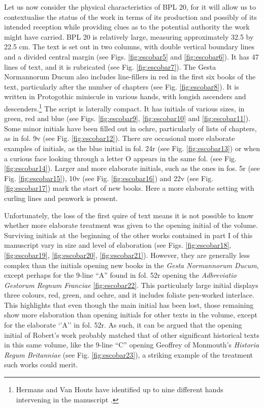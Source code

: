 \documentclass{article}
\begin{document}
Let us now consider the physical characteristics of BPL 20, for it will
allow us to contextualise the status of the work in terms of its
production and possibly of its intended reception while providing clues
as to the potential authority the work might have carried. BPL 20 is
relatively large, measuring approximately 32.5 by 22.5 cm. The text is
set out in two columns, with double vertical boundary lines and a
divided central margin (see Figs. \ref{fig:escobar5} and \ref{fig:escobar6}). It has 47 lines of text, and
it is rubricated (see Fig. \ref{fig:escobar7}). The Gesta Normannorum Ducum also includes
line-fillers in red in the first six books of the text, particularly
after the number of chapters (see Fig. \ref{fig:escobar8}). It is written in Protogothic
miniscule in various hands, with longish ascenders and
descenders.\footnote{Hermans and Van Houts have identified up to nine
  different hands intervening in the manuscript \citep[80]{hermans_history_1983}.} The script is laterally compact. It has initials of
various sizes, in green, red and blue (see Figs. \ref{fig:escobar9}, \ref{fig:escobar10} and \ref{fig:escobar11}). Some
minor initials have been filled out in ochre, particularly of lists of
chapters, as in fol. 9v (see Fig. \ref{fig:escobar12}). There are occasional more
elaborate examples of initials, as the blue initial in fol. 24r (see
Fig. \ref{fig:escobar13}) or when a curious face looking through a letter O appears in
the same fol. (see Fig. \ref{fig:escobar14}). Larger and more elaborate initials, such as
the ones in fos. 5r (see Fig. \ref{fig:escobar15}), 10v (see Fig. \ref{fig:escobar16}) and 22v (see Fig.
\ref{fig:escobar17}) mark the start of new books. Here a more elaborate setting with
curling lines and penwork is present.

Unfortunately, the loss of the first quire of text means it is not
possible to know whether more elaborate treatment was given to the
opening initial of the volume. Surviving initials at the beginning of
the other works contained in part I of this manuscript vary in size and
level of elaboration (see Figs. \ref{fig:escobar18}, \ref{fig:escobar19}, \ref{fig:escobar20}, \ref{fig:escobar21}). However, they are generally
less complex than the initials opening new books in the \emph{Gesta
Normannorum Ducum}, except perhaps for the 9-line ``A'' found in fol. 52r
opening the \emph{Adbreviatio Gestorum Regnum Franciae} \ref{fig:escobar22}.
This particularly large initial displays three colours, red, green, and
ochre, and it includes foliate pen-worked interlace. This highlights
that even though the main initial has been lost, those remaining show
more elaboration than opening initials for other texts in the volume,
except for the elaborate `'A'' in fol. 52r. As such, it can be argued that
the opening initial of Robert's work probably matched that of other
significant historical texts in this same volume, like the 9-line ``C''
opening Geoffrey of Monmouth's \emph{Historia Regum Britanniae} (see
Fig. \ref{fig:escobar23}), a striking example of the treatment such works could merit.
\end{document}
